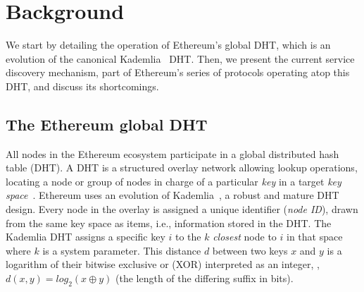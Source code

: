 

\section{Background}
\label{sec:background}

We start by detailing the operation of Ethereum's global DHT, which is an evolution of the canonical Kademlia~\cite{maymounkov2002kademlia} DHT.
Then, we present the current service discovery mechanism, part of Ethereum's \discv series of protocols operating atop this DHT, and discuss its shortcomings.

\subsection{The Ethereum global DHT}
\label{sec:background:dht}

All nodes in the Ethereum ecosystem participate in a global distributed hash table (DHT).
A DHT is a structured overlay network allowing lookup operations, \ie locating a node or group of nodes in charge of a particular \emph{key} in a target \emph{key space}~\cite{chord,rowstron2001pastry}. Ethereum uses an evolution of Kademlia~\cite{maymounkov2002kademlia}, a robust and mature DHT design. %
Every node in the overlay is assigned a unique identifier (\emph{node ID}), drawn from the same key space as items, i.e., information stored in the DHT. %
The Kademlia DHT assigns a specific key $i$ to the $k$ \emph{closest} node to $i$ in that space where $k$ is a system parameter.
This distance $d$ between two keys $x$ and $y$ is a logarithm of their bitwise exclusive or (XOR) interpreted as an integer, \ie, $d(x,y) = \textit{log}_2(x \oplus y)$ (\ie the length of the differing suffix in bits).


